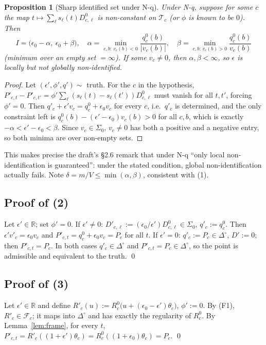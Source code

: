 \documentclass[11pt,a4paper]{article}
\newtheorem{proposition}[theorem]{Proposition}
\theoremstyle{definition}
\theoremstyle{remark}
\newcommand{\R}{\mathbb{R}}
\newcommand{\T}{\mathcal{T}}
\newcommand{\simp}{\Delta^{\circ}}
\newcommand{\eps}{\epsilon}
\begin{document}
\begin{proposition}[Sharp identified set under N-q]\label{prop:sharp}
Under N-q, suppose for some $c$ the map
$t\mapsto\sum_\ell s_\ell(t)D^0_{c,\ell}$ is non-constant on $\T_c$ (or $\phi$ is known
to be $0$). Then
\[
I=\bigl(\eps_0-\alpha,\ \eps_0+\beta\bigr),\quad
\alpha=\min_{c,b:\,v_c(b)<0}\frac{q^0_c(b)}{|v_c(b)|},\quad
\beta=\min_{c,b:\,v_c(b)>0}\frac{q^0_c(b)}{v_c(b)}
\]
(minimum over an empty set $=\infty$). If some $v_c\neq0$, then $\alpha,\beta<\infty$,
so $\eps$ is \emph{locally but not globally} non-identified.
\end{proposition}
\begin{proof}
Let $(\eps',\phi',q')\sim$ truth. For the $c$ in the hypothesis,
$P'_{c,t}-P'_{c,t'}=\phi'\sum_\ell(s_\ell(t)-s_\ell(t'))D^0_{c,\ell}$ must vanish for all
$t,t'$, forcing $\phi'=0$. Then $q'_c+\eps'v_c=q^0_c+\eps_0v_c$ for every $c$, i.e.\
$q'_c$ is determined, and the only constraint left is
$q^0_c(b)-(\eps'-\eps_0)v_c(b)>0$ for all $c,b$, which is exactly
$-\alpha<\eps'-\eps_0<\beta$. Since $v_c\in\Sigma_0$, $v_c\neq0$ has both a positive and
a negative entry, so both minima are over non-empty sets.
\end{proof}
This makes precise the draft's §2.6 remark that under N-q ``only local
non-identification is guaranteed'': under the stated condition, global
non-identification actually fails. Note $\delta=m/V\le\min(\alpha,\beta)$, consistent
with (1).

\subsection{Proof of (2)}
Let $\eps'\in\R$; set $\phi'=0$.
If $\eps'\neq0$: $D'_{c,\ell}:=(\eps_0/\eps')D^0_{c,\ell}\in\Sigma_0$, $q'_c:=q^0_c$.
Then $\eps'v'_c=\eps_0v_c$ and $P'_{c,t}=q^0_c+\eps_0v_c=P_c$ for all $t$.
If $\eps'=0$: $q'_c:=P_c\in\simp$, $D':=0$; then $P'_{c,t}=P_c$.
In both cases $q'_c\in\simp$ and $P'_{c,t}=P_c\in\simp$, so the point is admissible
and equivalent to the truth. \qed

\subsection{Proof of (3)}
Let $\eps'\in\R$ and define $R'_c(u):=R^0_c\bigl(u+(\eps_0-\eps')\theta_c\bigr)$,
$\phi':=0$. By (F1), $R'_c\in\mathcal F_c$; it maps into $\simp$ and has exactly the
regularity of $R^0_c$. By Lemma~\ref{lem:frame}, for every $t$,
$P'_{c,t}=R'_c((1+\eps')\theta_c)=R^0_c((1+\eps_0)\theta_c)=P_c$. \qed
\end{document}
